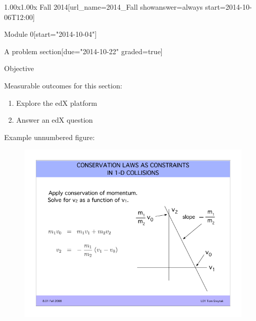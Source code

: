 \documentclass[12pt]{article}
\begin{document}
\begin{edXcourse}{1.00x}{1.00x Fall 2014}[url_name=2014_Fall showanswer=always start=2014-10-06T12:00]

\begin{edXchapter*}{Module 0}[start="2014-10-04"]

\begin{edXsequential}{A problem section}[due="2014-10-22" graded=true]

\begin{edXtext}{Objective}

Measurable outcomes for this section:
\begin{enumerate}
  \item {} Explore the edX platform
  \item Answer an edX question 
\end{enumerate}

Example unnumbered figure:
\begin{figure}
  \begin{center}
    \includegraphics{example-image}
  \end{center}
\end{figure}


\end{edXtext}
\end{edXsequential}
\end{edXchapter*}
\end{edXcourse}
\end{document}
